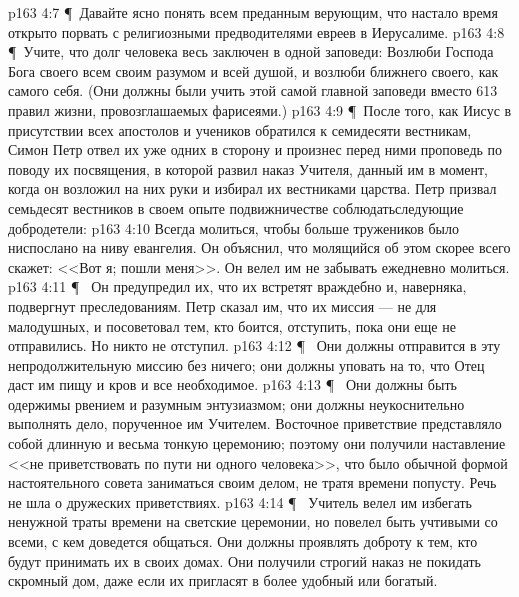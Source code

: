 \vs p163 4:7 \P\ \bibnobreakspace Давайте ясно понять всем преданным верующим, что настало время открыто порвать с религиозными предводителями евреев в Иерусалиме.
\vs p163 4:8 \P\ \bibnobreakspace Учите, что долг человека весь заключен в одной заповеди: Возлюби Господа Бога своего всем своим разумом и всей душой, и возлюби ближнего своего, как самого себя. (Они должны были учить этой самой главной заповеди вместо 613 правил жизни, провозглашаемых фарисеями.)
\vs p163 4:9 \P\ После того, как Иисус в присутствии всех апостолов и учеников обратился к семидесяти вестникам, Симон Петр отвел их уже одних в сторону и произнес перед ними проповедь по поводу их посвящения, в которой развил наказ Учителя, данный им в момент, когда он возложил на них руки и избирал их вестниками царства. Петр призвал семьдесят вестников в своем опыте подвижничестве соблюдатьследующие добродетели:
\vs p163 4:10 \bibnobreakspace {} Всегда молиться, чтобы больше тружеников было ниспослано на ниву евангелия. Он объяснил, что молящийся об этом скорее всего скажет: <<Вот я; пошли меня>>. Он велел им не забывать ежедневно молиться.
\vs p163 4:11 \P\ \bibnobreakspace {} Он предупредил их, что их встретят враждебно и, наверняка, подвергнут преследованиям. Петр сказал им, что их миссия --- не для малодушных, и посоветовал тем, кто боится, отступить, пока они еще не отправились. Но никто не отступил.
\vs p163 4:12 \P\ \bibnobreakspace {} Они должны отправится в эту непродолжительную миссию без ничего; они должны уповать на то, что Отец даст им пищу и кров и все необходимое.
\vs p163 4:13 \P\ \bibnobreakspace {} Они должны быть одержимы рвением и разумным энтузиазмом; они должны неукоснительно выполнять дело, порученное им Учителем. Восточное приветствие представляло собой длинную и весьма тонкую церемонию; поэтому они получили наставление <<не приветствовать по пути ни одного человека>>, что было обычной формой настоятельного совета заниматься своим делом, не тратя времени попусту. Речь не шла о дружеских приветствиях.
\vs p163 4:14 \P\ \bibnobreakspace {} Учитель велел им избегать ненужной траты времени на светские церемонии, но повелел быть учтивыми со всеми, с кем доведется общаться. Они должны проявлять доброту к тем, кто будут принимать их в своих домах. Они получили строгий наказ не покидать скромный дом, даже если их пригласят в более удобный или богатый.
